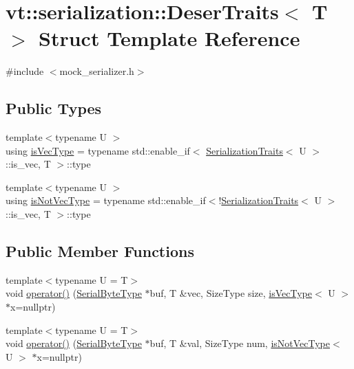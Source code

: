 \hypertarget{structvt_1_1serialization_1_1_deser_traits}{}\section{vt\+:\+:serialization\+:\+:Deser\+Traits$<$ T $>$ Struct Template Reference}
\label{structvt_1_1serialization_1_1_deser_traits}


{\ttfamily \#include $<$mock\+\_\+serializer.\+h$>$}

\subsection*{Public Types}
\begin{DoxyCompactItemize}
\item 
{\footnotesize template$<$typename U $>$ }\\using \hyperlink{structvt_1_1serialization_1_1_deser_traits_a597577985e3b199e73cf052e445c9a5e}{is\+Vec\+Type} = typename std\+::enable\+\_\+if$<$ \hyperlink{structvt_1_1serialization_1_1_serialization_traits}{Serialization\+Traits}$<$ U $>$\+::is\+\_\+vec, T $>$\+::type
\item 
{\footnotesize template$<$typename U $>$ }\\using \hyperlink{structvt_1_1serialization_1_1_deser_traits_a76eb20c400792b9288eabf2a7ffca4ba}{is\+Not\+Vec\+Type} = typename std\+::enable\+\_\+if$<$!\hyperlink{structvt_1_1serialization_1_1_serialization_traits}{Serialization\+Traits}$<$ U $>$\+::is\+\_\+vec, T $>$\+::type
\end{DoxyCompactItemize}
\subsection*{Public Member Functions}
\begin{DoxyCompactItemize}
\item 
{\footnotesize template$<$typename U  = T$>$ }\\void \hyperlink{structvt_1_1serialization_1_1_deser_traits_a26d43fcff6357964eed8a8f0172f28b8}{operator()} (\hyperlink{namespacevt_1_1serialization_a74f8d1a55940f9c38fc29522de66d926}{Serial\+Byte\+Type} $\ast$buf, T \&vec, Size\+Type size, \hyperlink{structvt_1_1serialization_1_1_deser_traits_a597577985e3b199e73cf052e445c9a5e}{is\+Vec\+Type}$<$ U $>$ $\ast$x=nullptr)
\item 
{\footnotesize template$<$typename U  = T$>$ }\\void \hyperlink{structvt_1_1serialization_1_1_deser_traits_a2562604ed89ca8421bed0266bd581c79}{operator()} (\hyperlink{namespacevt_1_1serialization_a74f8d1a55940f9c38fc29522de66d926}{Serial\+Byte\+Type} $\ast$buf, T \&val, Size\+Type num, \hyperlink{structvt_1_1serialization_1_1_deser_traits_a76eb20c400792b9288eabf2a7ffca4ba}{is\+Not\+Vec\+Type}$<$ U $>$ $\ast$x=nullptr)
\end{DoxyCompactItemize}


